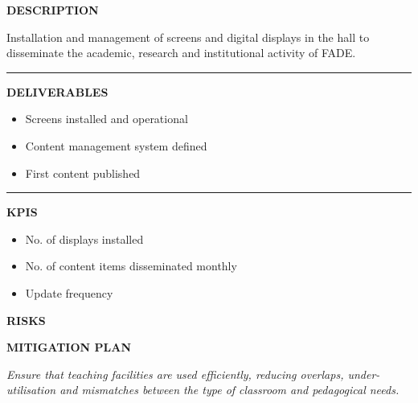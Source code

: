 \documentclass[11pt,a4paper]{scrreprt}
\newcommand{\fieldlabel}[1]{%
  {\footnotesize\sffamily\bfseries\color{mutedcolor}\MakeUppercase{#1}}\par\nopagebreak[4]
}
\newcommand{\fieldsep}{\vspace{3pt}\noindent\textcolor{bordercolor}{\rule{\linewidth}{0.4pt}}\vspace{3pt}\par}
\begin{document}
\begin{tcolorbox}[pabox={espcolor}{A.P.3.2 \enspace\textbullet\enspace Digital Communication Displays}]

\fieldlabel{Description}
{\small Installation and management of screens and digital displays in the hall to disseminate the academic, research and institutional activity of FADE.}\par
\fieldsep
\fieldlabel{Deliverables}
{\small \begin{itemize}[noitemsep,topsep=2pt]
\item Screens installed and operational
\item Content management system defined
\item First content published
\end{itemize}}\par
\fieldsep
\fieldlabel{KPIs}
{\small \begin{itemize}[noitemsep,topsep=2pt]
\item No. of displays installed
\item No. of content items disseminated monthly
\item Update frequency
\end{itemize}}\par
\end{tcolorbox}
\begin{tcolorbox}[riskbox]
{\footnotesize\sffamily\bfseries\color{red!50!black} RISKS}\par{}
\end{tcolorbox}
\begin{tcolorbox}[mitbox]
{\footnotesize\sffamily\bfseries\color{green!40!black} MITIGATION PLAN}\par{}
\end{tcolorbox}
\vspace{8pt}

\newpage
{}
{\small\color{mutedcolor}\itshape Ensure that teaching facilities are used efficiently, reducing overlaps, under-utilisation and mismatches between the type of classroom and pedagogical needs.}\par\vspace{6pt}
\end{document}
